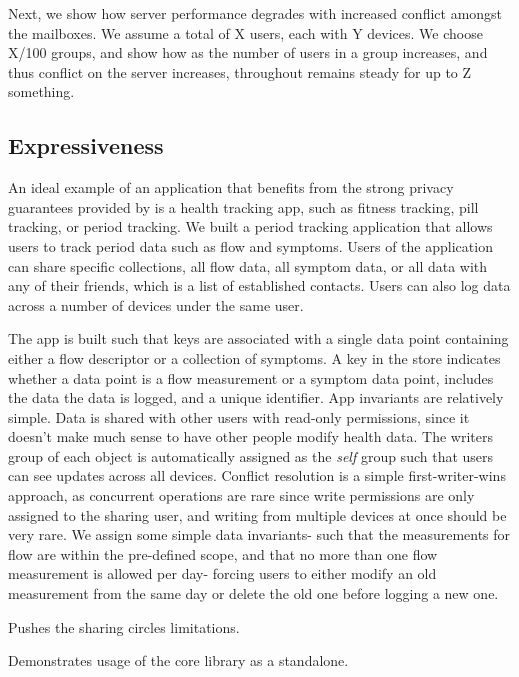 Next, we show how server performance degrades with increased conflict amongst the mailboxes. We assume a total of X users, each with Y devices. We choose X/100 groups, and show how as the number of users in a group increases, and thus conflict on the server increases, throughout remains steady for up to Z something.

\subsection{Expressiveness}

An ideal example of an application that benefits from the strong privacy guarantees provided by \name{} is a health tracking app, such as fitness tracking, pill tracking, or period tracking. We built a period tracking application that allows users to track period data such as flow and symptoms. Users of the application can share specific collections, all flow data, all symptom data, or all data with any of their friends, which is a list of established contacts. Users can also log data across a number of devices under the same user. 

The app is built such that keys are associated with a single data point containing either a flow descriptor or a collection of symptoms. A key in the store indicates whether a data point is a flow measurement or a symptom data point, includes the data the data is logged, and a unique identifier. App invariants are relatively simple. Data is shared with other users with read-only permissions, since it doesn't make much sense to have other people modify health data. The writers group of each object is automatically assigned as the \textit{self} group such that users can see updates across all devices. Conflict resolution is a simple first-writer-wins approach, as concurrent operations are rare since write permissions are only assigned to the sharing user, and writing from multiple devices at once should be very rare. We assign some simple data invariants- such that the measurements for flow are within the pre-defined scope, and that no more than one flow measurement is allowed per day- forcing users to either modify an old measurement from the same day or delete the old one before logging a new one. 

Pushes the sharing circles limitations.

Demonstrates usage of the core library as a standalone.


